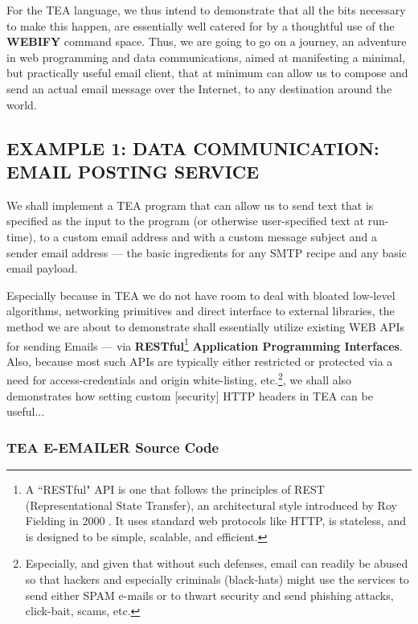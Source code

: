 \documentclass[a4paper, 18pt]{book} %
\begin{document}
{{{\vspace{2em}
For the TEA language, we thus intend to demonstrate that all the bits necessary to make this happen, are essentially well catered for by a thoughtful use of the \textbf{WEBIFY} command space. Thus, we are going to go on a journey, an adventure in web programming and data communications, aimed at manifesting a minimal, but practically useful email client, that at minimum can allow us to compose and send an actual email message over the Internet, to any destination around the world.


\subsection{EXAMPLE 1: \textbf{DATA COMMUNICATION:} EMAIL POSTING SERVICE}
\label{SECEXAMP1W}


We shall implement a TEA program that can allow us to send text that is specified as the input to the program (or otherwise user-specified text at run-time), to a custom email address and with a custom message subject and a sender email address --- the basic ingredients for any SMTP recipe and any basic email payload.

\vspace{2em}

Especially because in TEA we do not have room to deal with bloated low-level algorithms, networking primitives and direct interface to external libraries, the method we are about to demonstrate shall essentially utilize existing WEB APIs for sending Emails --- via \textbf{RESTful}\footnote{A ``RESTful" API is one that follows the principles of REST (Representational State Transfer), an architectural style introduced by Roy Fielding in 2000 \cite{copilot_assistant}. It uses standard web protocols like HTTP, is stateless, and is designed to be simple, scalable, and efficient.} \textbf{Application Programming Interfaces}. Also, because most such APIs are typically either restricted or protected via a need for access-credentials and origin white-listing, etc.\footnote{Especially, and given that without such defenses, email can readily be abused so that hackers and especially criminals (black-hats) might use the services to send either SPAM e-mails or to thwart security and send phishing attacks, click-bait, scams, etc.}, we shall also demonstrates how setting custom [security] HTTP headers in TEA can be useful...


\vspace{2em}

\subsubsection{TEA E-EMAILER Source Code}


}}}
\end{document}
